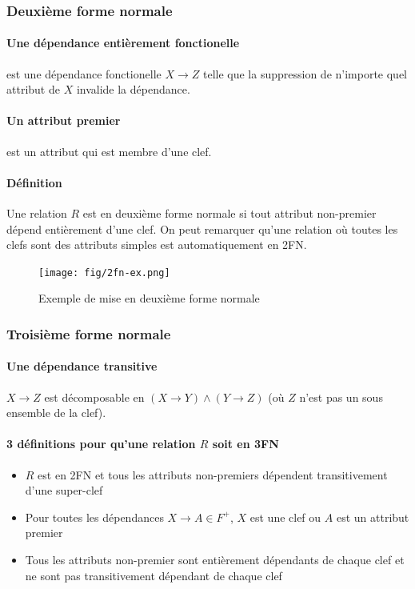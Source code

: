 \documentclass[a4paper]{article}
\begin{document}
\subsubsection{Deuxième forme normale}
\paragraph{Une dépendance entièrement fonctionelle} est une dépendance fonctionelle
$X \rightarrow Z$ telle que la suppression de n'importe quel attribut de $X$ invalide
la dépendance.
\paragraph{Un attribut premier} est un attribut qui est membre d'une clef.
\paragraph{Définition} Une relation $R$ est en deuxième forme normale si tout
attribut non-premier dépend entièrement d'une clef. On peut remarquer qu'une relation
où toutes les clefs sont des attributs simples est automatiquement en 2FN.

\begin{figure}[H]
\center
\texttt{[image: fig/2fn-ex.png]}
\caption{Exemple de mise en deuxième forme normale}
\end{figure}

\subsubsection{Troisième forme normale}
\paragraph{Une dépendance transitive} $X \rightarrow Z$ est décomposable en
$(X \rightarrow Y) \land (Y \rightarrow Z)$ (où $Z$ n'est pas un sous ensemble de la clef).
\paragraph{3 définitions pour qu'une relation $R$ soit en 3FN}
\begin{itemize}
  \item $R$ est en 2FN et tous les attributs non-premiers dépendent transitivement d'une super-clef
  \item Pour toutes les dépendances $X \rightarrow A \in F^+$, $X$ est une clef ou $A$ est un attribut premier
  \item Tous les attributs non-premier sont entièrement dépendants de chaque clef
        et ne sont pas transitivement dépendant de chaque clef
\end{itemize}
\end{document}
